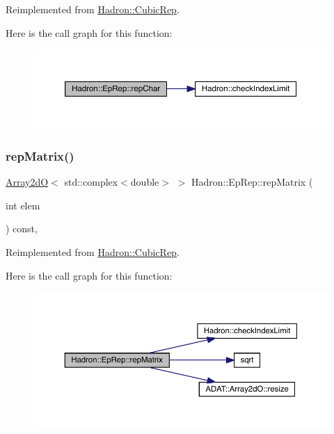 Reimplemented from \mbox{\hyperlink{structHadron_1_1CubicRep_af45227106e8e715e84b0af69cd3b36f8}{Hadron\+::\+Cubic\+Rep}}.

Here is the call graph for this function\+:
\nopagebreak
\begin{figure}[H]
\begin{center}
\leavevmode
\includegraphics[width=350pt]{d7/da2/structHadron_1_1EpRep_a87fd401f4263b709af08948c9452a717_cgraph}
\end{center}
\end{figure}
\mbox{\label{structHadron_1_1EpRep_a51731663ac1ad2e9e41f7527b536e2b5}} 
\subsubsection{\texorpdfstring{repMatrix()}{repMatrix()}\hspace{0.1cm}{\footnotesize\ttfamily [1/2]}}
{\footnotesize\ttfamily \mbox{\hyperlink{classADAT_1_1Array2dO}{Array2dO}}$<$ std\+::complex$<$double$>$ $>$ Hadron\+::\+Ep\+Rep\+::rep\+Matrix (\begin{DoxyParamCaption}\item[{int}]{elem }\end{DoxyParamCaption}) const\hspace{0.3cm}{\ttfamily [inline]}, {\ttfamily [virtual]}}



Reimplemented from \mbox{\hyperlink{structHadron_1_1CubicRep_ac5d7e9e6f4ab1158b5fce3e4ad9e8005}{Hadron\+::\+Cubic\+Rep}}.

Here is the call graph for this function\+:
\nopagebreak
\begin{figure}[H]
\begin{center}
\leavevmode
\includegraphics[width=350pt]{d7/da2/structHadron_1_1EpRep_a51731663ac1ad2e9e41f7527b536e2b5_cgraph}
\end{center}
\end{figure}
\mbox{\label{structHadron_1_1EpRep_a51731663ac1ad2e9e41f7527b536e2b5}} 

